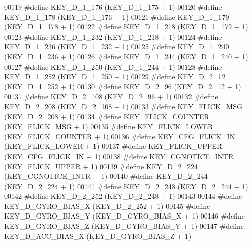 \begin{DoxyCode}
00119 \textcolor{preprocessor}{#define KEY\_D\_1\_176                 (KEY\_D\_1\_175 + 1)}
00120 \textcolor{preprocessor}{#define KEY\_D\_1\_178                 (KEY\_D\_1\_176 + 1)}
00121 \textcolor{preprocessor}{#define KEY\_D\_1\_179                 (KEY\_D\_1\_178 + 1)}
00122 \textcolor{preprocessor}{#define KEY\_D\_1\_218                 (KEY\_D\_1\_179 + 1)}
00123 \textcolor{preprocessor}{#define KEY\_D\_1\_232                 (KEY\_D\_1\_218 + 1)}
00124 \textcolor{preprocessor}{#define KEY\_D\_1\_236                 (KEY\_D\_1\_232 + 1)}
00125 \textcolor{preprocessor}{#define KEY\_D\_1\_240                 (KEY\_D\_1\_236 + 1)}
00126 \textcolor{preprocessor}{#define KEY\_D\_1\_244                 (KEY\_D\_1\_240 + 1)}
00127 \textcolor{preprocessor}{#define KEY\_D\_1\_250                 (KEY\_D\_1\_244 + 1)}
00128 \textcolor{preprocessor}{#define KEY\_D\_1\_252                 (KEY\_D\_1\_250 + 1)}
00129 \textcolor{preprocessor}{#define KEY\_D\_2\_12                  (KEY\_D\_1\_252 + 1)}
00130 \textcolor{preprocessor}{#define KEY\_D\_2\_96                  (KEY\_D\_2\_12 + 1)}
00131 \textcolor{preprocessor}{#define KEY\_D\_2\_108                 (KEY\_D\_2\_96 + 1)}
00132 \textcolor{preprocessor}{#define KEY\_D\_2\_208                 (KEY\_D\_2\_108 + 1)}
00133 \textcolor{preprocessor}{#define KEY\_FLICK\_MSG               (KEY\_D\_2\_208 + 1)}
00134 \textcolor{preprocessor}{#define KEY\_FLICK\_COUNTER           (KEY\_FLICK\_MSG + 1)}
00135 \textcolor{preprocessor}{#define KEY\_FLICK\_LOWER             (KEY\_FLICK\_COUNTER + 1)}
00136 \textcolor{preprocessor}{#define KEY\_CFG\_FLICK\_IN            (KEY\_FLICK\_LOWER + 1)}
00137 \textcolor{preprocessor}{#define KEY\_FLICK\_UPPER             (KEY\_CFG\_FLICK\_IN + 1)}
00138 \textcolor{preprocessor}{#define KEY\_CGNOTICE\_INTR           (KEY\_FLICK\_UPPER + 1)}
00139 \textcolor{preprocessor}{#define KEY\_D\_2\_224                 (KEY\_CGNOTICE\_INTR + 1)}
00140 \textcolor{preprocessor}{#define KEY\_D\_2\_244                 (KEY\_D\_2\_224 + 1)}
00141 \textcolor{preprocessor}{#define KEY\_D\_2\_248                 (KEY\_D\_2\_244 + 1)}
00142 \textcolor{preprocessor}{#define KEY\_D\_2\_252                 (KEY\_D\_2\_248 + 1)}
00143 
00144 \textcolor{preprocessor}{#define KEY\_D\_GYRO\_BIAS\_X               (KEY\_D\_2\_252 + 1)}
00145 \textcolor{preprocessor}{#define KEY\_D\_GYRO\_BIAS\_Y               (KEY\_D\_GYRO\_BIAS\_X + 1)}
00146 \textcolor{preprocessor}{#define KEY\_D\_GYRO\_BIAS\_Z               (KEY\_D\_GYRO\_BIAS\_Y + 1)}
00147 \textcolor{preprocessor}{#define KEY\_D\_ACC\_BIAS\_X                (KEY\_D\_GYRO\_BIAS\_Z + 1)}

\end{DoxyCode}
